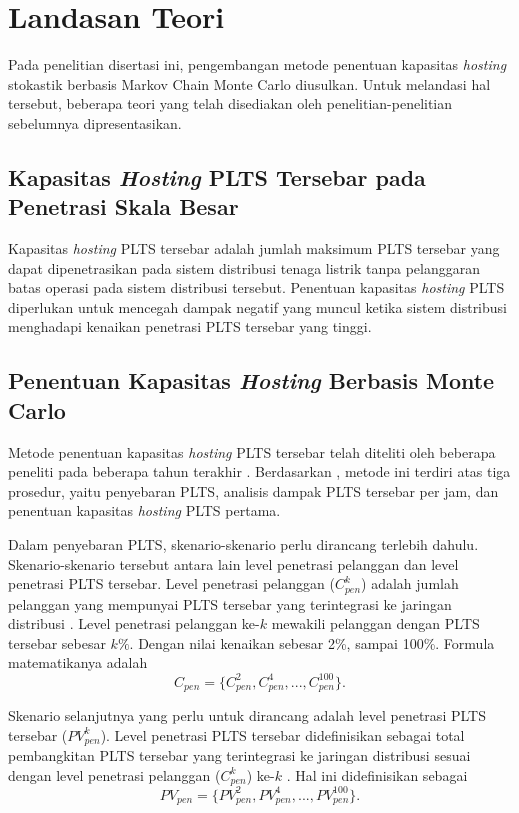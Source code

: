 {{{{{{\section{Landasan Teori}
Pada penelitian disertasi ini, pengembangan metode penentuan kapasitas \textit{hosting} stokastik berbasis Markov Chain Monte Carlo diusulkan. Untuk melandasi hal tersebut, beberapa teori yang telah disediakan oleh penelitian-penelitian sebelumnya dipresentasikan.

\subsection{Kapasitas \textit{Hosting} PLTS Tersebar pada Penetrasi Skala Besar}
Kapasitas \textit{hosting} PLTS tersebar adalah jumlah maksimum PLTS tersebar yang dapat dipenetrasikan pada sistem distribusi tenaga listrik tanpa pelanggaran batas operasi pada sistem distribusi tersebut. Penentuan kapasitas \textit{hosting} PLTS diperlukan untuk mencegah dampak negatif yang muncul ketika sistem distribusi menghadapi kenaikan penetrasi PLTS tersebar yang tinggi. 

\subsection{Penentuan Kapasitas \textit{Hosting} Berbasis Monte Carlo}
Metode penentuan kapasitas \textit{hosting} PLTS tersebar telah diteliti oleh beberapa peneliti pada beberapa tahun terakhir \cite{Dubey2017,Torquato2018,Ding2017}. Berdasarkan \cite{Dubey2017}, metode ini terdiri atas tiga prosedur, yaitu penyebaran PLTS, analisis dampak PLTS tersebar per jam, dan penentuan kapasitas \textit{hosting} PLTS pertama.

Dalam penyebaran PLTS, skenario-skenario perlu dirancang terlebih dahulu. Skenario-skenario tersebut antara lain level penetrasi pelanggan dan level penetrasi PLTS tersebar. Level penetrasi pelanggan ($C_{pen}^k$) adalah jumlah pelanggan yang mempunyai PLTS tersebar yang terintegrasi ke jaringan distribusi \cite{Dubey2017}. Level penetrasi pelanggan ke-$k$ mewakili pelanggan dengan PLTS tersebar sebesar $k\%$. Dengan nilai kenaikan sebesar 2\%, sampai 100\%. Formula matematikanya adalah
\begin{equation}
C_{pen}=\{C^2_{pen},C^4_{pen},...,C^{100}_{pen}\}\label{cpl}.
\end{equation}

Skenario selanjutnya yang perlu untuk dirancang adalah level penetrasi PLTS tersebar ($PV^k_{pen}$). Level penetrasi PLTS tersebar didefinisikan sebagai total pembangkitan PLTS tersebar yang terintegrasi ke jaringan distribusi sesuai dengan level penetrasi pelanggan ($C_{pen}^k$) ke-$k$ \cite{Dubey2017}. Hal ini didefinisikan sebagai
\begin{equation}
PV_{pen}=\{PV^2_{pen},PV^4_{pen},...,PV^{100}_{pen}\}\label{rppl}.
\end{equation}

}}}}}}
